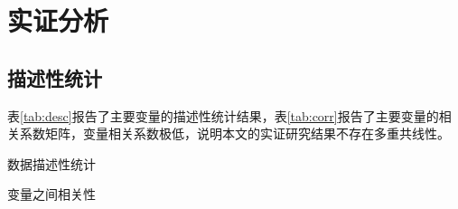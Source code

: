 \chapter{实证分析}
\section{描述性统计}

表\ref{tab:desc}报告了主要变量的描述性统计结果，表\ref{tab:corr}报告了主要变量的相关系数矩阵，变量相关系数极低，说明本文的实证研究结果不存在多重共线性。
\begin{table}[H]
    \caption{数据描述性统计}\label{tab:desc}
    \centering
    
\end{table}
\begin{table}[H]
    \caption{变量之间相关性}\label{tab:corr}
    \centering
    
\end{table}
